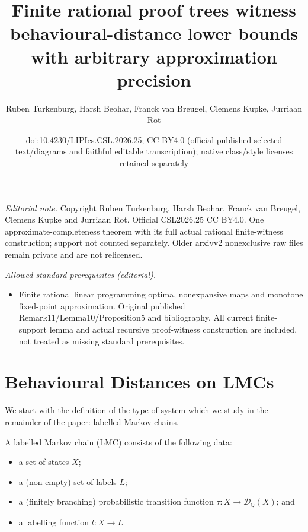 \documentclass[a4paper,UKenglish,cleveref,autoref,thm-restate]{lipics-v2021}
\title{Finite rational proof trees witness behavioural-distance lower bounds with arbitrary approximation precision}
\author{Ruben Turkenburg, Harsh Beohar, Franck van Breugel, Clemens Kupke, Jurriaan Rot}
\date{doi:10.4230/LIPIcs.CSL.2026.25; CC BY4.0 (official published selected text/diagrams and faithful editable transcription); native class/style licenses retained separately}
\newcommand{\D}{\mathcal{D}}
\begin{document}
\maketitle
\noindent\textit{Editorial note.} Copyright Ruben Turkenburg, Harsh Beohar, Franck van Breugel, Clemens Kupke and Jurriaan Rot. Official CSL2026.25 CC BY4.0. One approximate-completeness theorem with its full actual rational finite-witness construction; support not counted separately. Older arxivv2 nonexclusive raw files remain private and are not relicensed.\par\medskip
\noindent\textit{Allowed standard prerequisites (editorial).}\begin{itemize}
\item Finite rational linear programming optima, nonexpansive maps and monotone fixed-point approximation. Original published Remark11/Lemma10/Proposition5 and bibliography. All current finite-support lemma and actual recursive proof-witness construction are included, not treated as missing standard prerequisites.
\end{itemize}\medskip
\section{Behavioural Distances on LMCs}\label{sec:behdist}
We start with the definition of the type of system which we study in the remainder of the paper: labelled Markov chains.

\begin{definition}
	A labelled Markov chain (LMC) consists of the following data:
	\begin{itemize}
		\item a set of states \(X\);
		\item a (non-empty) set of labels \(L\);
		\item a (finitely branching) probabilistic transition function \(\tau \colon X \to \D_\mathbb{Q}(X)\); and
		\item a labelling function \(l \colon X \to L\)
	\end{itemize}
\end{definition}
\end{document}
